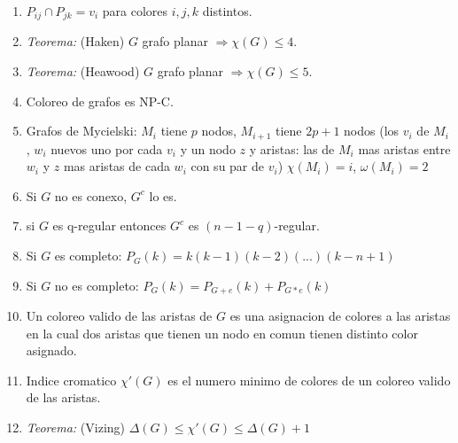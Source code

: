 \begin{enumerate}
\item $P_{ij} \cap P_{jk} = {v_{i}}$ para colores $i,j,k$ distintos.
\item \textit{Teorema:} (Haken) $G$ grafo planar $\Rightarrow \chi(G) \leq 4$.
\item \textit{Teorema:} (Heawood) $G$ grafo planar $\Rightarrow \chi(G) \leq 5$.
\item Coloreo de grafos es NP-C.
\item Grafos de Mycielski: $M_{i}$ tiene $p$ nodos, $M_{i+1}$ tiene $2p+1$ nodos (los $v_{i}$ de $M_{i}$, $w_{i}$ nuevos uno por cada $v_{i}$ y un nodo $z$ y aristas: las de $M_{i}$ mas aristas entre $w_{i}$ y $z$ mas aristas de cada $w_{i}$ con su par de $v_{i}$) $\chi(M_{i})=i$, $\omega(M_{i})=2$
\item Si $G$ no es conexo, $G^{c}$ lo es.
\item si $G$ es q-regular entonces $G^{c}$ es $(n-1-q)$-regular.
\item Si $G$ es completo: $P_{G}(k)= k(k-1)(k-2)(...)(k-n+1)$
\item Si $G$ no es completo: $P_{G}(k)= P_{G+e}(k) + P_{G*e}(k)$
\item Un coloreo valido de las aristas de $G$ es una asignacion de colores a las aristas en la cual dos aristas que tienen un nodo en comun tienen distinto color asignado.
\item Indice cromatico $\chi'(G)$ es el numero minimo de colores de un coloreo valido de las aristas.
\item \textit{Teorema:} (Vizing) $\Delta(G) \leq \chi'(G) \leq \Delta(G)+1$
\end{enumerate}
